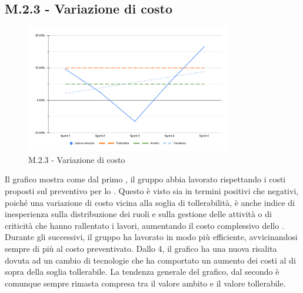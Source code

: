 \subsection{M.2.3 - Variazione di costo}
\begin{figure}[H]
    \centering
    \includegraphics[width=0.8\textwidth]{assets/variazione_costo.pdf}
    \caption{M.2.3 - Variazione di costo}
\end{figure}

\par Il grafico mostra come dal primo , il gruppo abbia lavorato rispettando i costi proposti sul preventivo per lo . Questo è visto sia in termini positivi che negativi, poiché una variazione di costo vicina alla soglia di tollerabilità, è anche indice di inesperienza sulla distribuzione dei ruoli e sulla gestione delle attività o di criticità che hanno rallentato i lavori, aumentando il costo complessivo dello .
Durante gli  successivi, il gruppo ha lavorato in modo più efficiente, avvicinandosi sempre di più al costo preventivato. Dallo  4, il grafico ha una nuova risalita dovuta ad un cambio di tecnologie che ha comportato un aumento dei costi al di sopra della soglia tollerabile. La tendenza generale del grafico, dal secondo  è comunque sempre rimasta compresa tra il valore ambito e il valore tollerabile. 